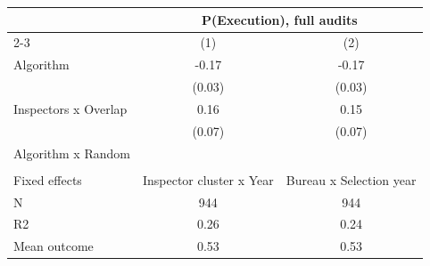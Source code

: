 \begin{tabular}{lcc} \toprule
\multicolumn{1}{l}{} & \multicolumn{2}{c}{P(Execution), full audits} \\\cmidrule(lr){2-3} \multicolumn{1}{l}{} & (1) & (2) \\ \midrule
Algorithm   &       -0.17\sym{***}&       -0.17\sym{***}\\
            &      (0.03)         &      (0.03)         \\
\addlinespace
Inspectors x Overlap&        0.16\sym{**} &        0.15\sym{**} \\
            &      (0.07)         &      (0.07)         \\
\addlinespace
Algorithm x Random&                     &                     \\
            &                     &                     \\
\midrule
Fixed effects&Inspector cluster x Year         &Bureau x Selection year         \\
N           &         944         &         944         \\
R2          &        0.26         &        0.24         \\
Mean outcome&        0.53         &        0.53         \\
\bottomrule \end{tabular}
